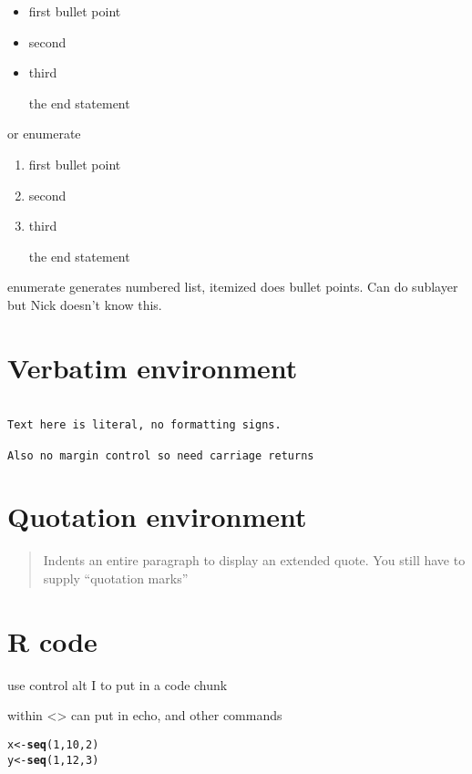 \documentclass{article}\usepackage[]{graphicx}\usepackage[]{color}
\makeatletter
\newcommand{\hlnum}[1]{\textcolor[rgb]{0.686,0.059,0.569}{#1}}%
\newcommand{\hlstd}[1]{\textcolor[rgb]{0.345,0.345,0.345}{#1}}%
\newcommand{\hlkwb}[1]{\textcolor[rgb]{0.69,0.353,0.396}{#1}}%
\newcommand{\hlkwd}[1]{\textcolor[rgb]{0.737,0.353,0.396}{\textbf{#1}}}%
\newenvironment{kframe}{%
 \def\at@end@of@kframe{}%
 \ifinner\ifhmode%
  \def\at@end@of@kframe{\end{minipage}}%
  \begin{minipage}{\columnwidth}%
 \fi\fi%
 \def\FrameCommand##1{\hskip\@totalleftmargin \hskip-\fboxsep
 \colorbox{shadecolor}{##1}\hskip-\fboxsep
     \hskip-\linewidth \hskip-\@totalleftmargin \hskip\columnwidth}%
 \MakeFramed {\advance\hsize-\width
   \@totalleftmargin\z@ \linewidth\hsize
   \@setminipage}}%
 {\par\unskip\endMakeFramed%
 \at@end@of@kframe}
\newenvironment{knitrout}{}{} %
\makeatother
\begin{document}
\begin{itemize}
  \item first bullet point
  \item second
  \item third
  
the end statement

\end{itemize}

or enumerate

\begin{enumerate}
  \item first bullet point
  \item second
  \item third
  
the end statement

\end{enumerate}

enumerate generates numbered list, itemized does bullet points. Can do sublayer but Nick doesn't know this.

\section*{Verbatim environment}

\begin{verbatim}

Text here is literal, no formatting signs.

Also no margin control so need carriage returns

\end{verbatim}


\section*{Quotation environment}

\begin{quote}

Indents an entire paragraph to display an extended quote. You still have to supply ``quotation marks''

\end{quote}

\section*{R code}

use control alt I to put in a code chunk

within <> can put in echo, and other commands

\begin{knitrout}
\color{fgcolor}\begin{kframe}
\begin{alltt}
\hlstd{x} \hlkwb{<-} \hlkwd{seq}\hlstd{(}\hlnum{1}\hlstd{,}\hlnum{10}\hlstd{,}\hlnum{2}\hlstd{)}
\hlstd{y} \hlkwb{<-} \hlkwd{seq}\hlstd{(}\hlnum{1}\hlstd{,}\hlnum{12}\hlstd{,}\hlnum{3}\hlstd{)}
\end{alltt}
\end{kframe}
\end{knitrout}
\end{document}
